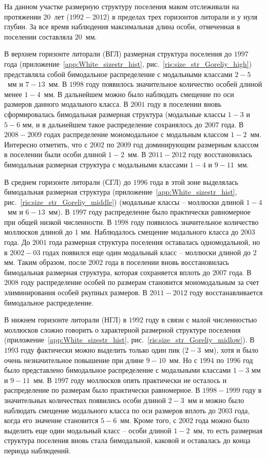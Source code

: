 На данном участке размерную структуру поселения маком отслеживали на протяжении $20$~лет ($1992 - 2012$) в пределах трех горизонтов литорали и у нуля глубин.
За все время наблюдения максимальная длина особи, отмеченная в поселении составляла $20$~мм.

В верхнем горизонте литорали (ВГЛ) размерная структура поселения до $1997$ года (приложение~\ref{app:White_sizestr_hist}, рис.~\ref{ris:size_str_Goreliy_high}) представляла собой бимодальное распределение с модальными классами $2-5$~мм и $7-13$~мм.
В $1998$ году появилось значительное количество особей длиной менее $1-4$~мм. 
В дальнейшем можно было наблюдать смещение по оси размеров данного модального класса. 
В $2001$ году в поселении вновь сформировалась бимодальная размерная структура (модальные классы $1-3$ и $5-6$ мм, и в дальнейшем такое распределение сохранялось до $2007$ года.
В $2008 - 2009$ годах распределение мономодальное с модальным классом $1-2$~мм.
Интересно отметить, что с $2002$ по $2009$ год доминирующим размерным классом в поселении были особи длиной $1-2$~мм.
В $2011-2012$ году восстановилась бимодальная размерная структура с модальными классами $1-4$ и $9-11$~мм.

В среднем горизонте литорали (СГЛ) до $1996$ года в этой зоне выделялась бимодальная размерная структура (приложение~\ref{app:White_sizestr_hist}, рис.~\ref{ris:size_str_Goreliy_middle}) (модальные классы -- моллюски длиной $1-4$~мм и $6-13$~мм). 
В $1997$ году распределение было практически равномерное при общей низкой численности. 
В $1998$ году появилось значительное количество моллюсков длиной до $1$ мм. 
Наблюдалось смещение модального класса до $2003$ года. 
До $2001$ года размерная структура поселения оставалась одномодальной, но в $2002-03$ годах появился еще один модальный класс -- моллюски длиной до $2$ мм. 
Таким образом, после $2002$ года  в поселении вновь восстановилась бимодальная размерная структура, которая сохраняется вплоть до $2007$ года.
В $2008$ году распределение особей по размерам становится мономодальным за счет элиминирования особей ркупных размеров. 
В $2011-2012$ году восстанавливается бимодальное распределение.


В нижнем горизонте литорали (НГЛ) в $1992$ году в связи с малой численностью моллюсков сложно говорить о характерной размерной структуре поселения (приложение~\ref{app:White_sizestr_hist}, рис.~\ref{ris:size_str_Goreliy_midlow}).
В $1993$ году фактически можно выделить только один пик ($2-3$~мм), хотя и было очень незначительное повышение при длине $9-10$~мм. 
Но с $1994$ по $1996$ год было представлено бимодальное распределение с модальными классами $1-3$ мм и $9-11$~мм.
В $1997$ году моллюсков опять практически не осталось и распределение по размерам было практически равномерное. 
В $1998-1999$ году в значительных количествах появились особи длиной $2-3$~мм и можно было наблюдать смещение модального класса по оси размеров вплоть до $2003$ года, когда его значение становится $5-6$~мм. 
Кроме того, с $2002$ года можно было выделить еще один модальный класс -- особи длиной $1-2$~мм, то есть размерная структура поселения вновь стала бимодальной, каковой и оставалась до конца периода наблюдений.


